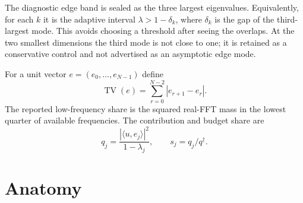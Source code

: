 \documentclass[11pt]{article}
\theoremstyle{remark}
\newcommand{\qdag}{q^{\dagger}}
\newcommand{\TV}{\operatorname{TV}}
\begin{document}
The diagnostic edge band is sealed as the three largest eigenvalues.
Equivalently, for each $k$ it is the adaptive interval
$\lambda>1-\delta_k$, where $\delta_k$ is the gap of the third-largest
mode.  This avoids choosing a threshold after seeing the overlaps.
At the two smallest dimensions the third mode is not close to one; it is
retained as a conservative control and not advertised as an asymptotic
edge mode.

For a unit vector $e=(e_0,\ldots,e_{N-1})$ define
\[
 \TV(e)=\sum_{r=0}^{N-2}|e_{r+1}-e_r|.
\]
The reported low-frequency share is the squared real-FFT mass in the
lowest quarter of available frequencies.  The contribution and budget
share are
\[
 q_j=\frac{|\langle u,e_j\rangle|^2}{1-\lambda_j},
 \qquad s_j=q_j/\qdag.
\]

\section{Anatomy}
\end{document}
